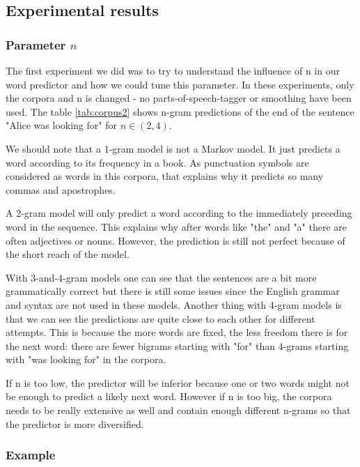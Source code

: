 \documentclass[a4paper,12pt]{article}
\begin{document}
\subsection{Experimental results}
\subsubsection{Parameter $n$}
	The first experiment we did was to try to understand the influence of n in our word predictor and how we could tune this parameter. In these experiments, only the corpora and n is changed - no parts-of-speech-tagger or smoothing have been used. The table \ref{tab:corpus2} shows n-gram predictions of the end of the sentence "Alice was looking for" for $ n\in(2,4) $.
	
We should note that a 1-gram model is not a Markov model. It just predicts a word according to its frequency in a book. As punctuation symbols are considered as words in this corpora, that explains why it predicts so many commas and apostrophes. 

A 2-gram model will only predict a word according to the immediately preceding word in the sequence. This explains why after words like "the" and "a" there are often adjectives or nouns. However, the prediction is still not perfect because of the short reach of the model.

With 3-and-4-gram models one can see that the sentences are a bit more grammatically correct but there is still some issues since the English grammar and syntax are not used in these models. Another thing with 4-gram models is that we can see the predictions are quite close to each other for different attempts. This is because the more words are fixed, the less freedom there is for the next word: there are fewer bigrams starting with "for" than 4-grams starting with "was looking for" in the corpora.

If n is too low, the predictor will be inferior because one or two words might not be enough to predict a likely next word. However if n is too big, the corpora needs to be really extensive as well and contain enough different n-grams so that the predictor is more diversified.

\subsubsection{Example}
\end{document}
